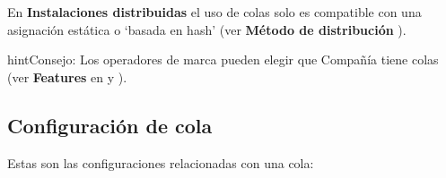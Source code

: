 \documentclass[letterpaper,10pt,spanish]{sphinxmanual}
\begin{document}
En \textbf{Instalaciones distribuidas} el uso de colas solo es compatible con una asignación estática o `basada en hash' (ver \textbf{Método de distribución} {\hyperref[internal_calls/brand_portal:remaining\string-parameters]{}}).

\begin{notice}{hint}{Consejo:}
Los operadores de marca pueden elegir que Compañía tiene colas (ver \textbf{Features} en {\hyperref[internal_calls/brand_portal:brand\string-configuration]{}} y {\hyperref[internal_calls/company_portal:company\string-configuration]{}}).
\end{notice}


\subsection{Configuración de cola}
\label{pbx_features/queues:queue-configuration}
Estas son las configuraciones relacionadas con una cola:
\end{document}
